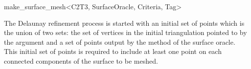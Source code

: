 \begin{ccRefFunction}{make_surface_mesh<C2T3, SurfaceOracle,
Criteria, Tag>}



The Delaunay refinement
process is started with an initial set of points which is the union 
of two sets: the
set of vertices in the initial  triangulation pointed to by the
 argument   and a set of
points output by the  method 
of the surface oracle.
This initial set of points is required to include at least one point
on each connected components of the surface to be meshed.



 



\ccSeeAlso
 \\
 \\
 \\
 \\
 \\







\end{ccRefFunction}


